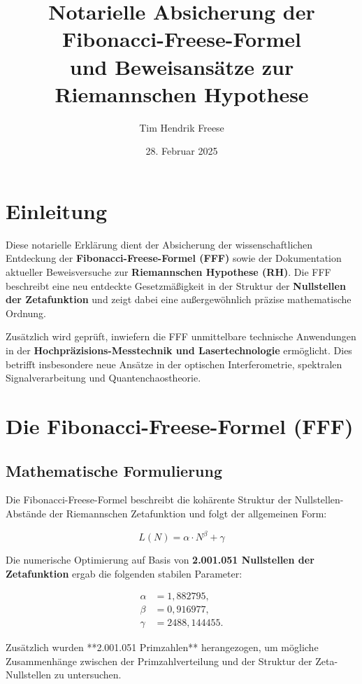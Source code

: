 \documentclass[a4paper,12pt]{article}
\title{Notarielle Absicherung der Fibonacci-Freese-Formel \\ und Beweisansätze zur Riemannschen Hypothese}
\author{Tim Hendrik Freese}
\date{28. Februar 2025}
\begin{document}
\maketitle

\section*{Einleitung}

Diese notarielle Erklärung dient der Absicherung der wissenschaftlichen Entdeckung der \textbf{Fibonacci-Freese-Formel (FFF)} sowie der Dokumentation aktueller Beweisversuche zur \textbf{Riemannschen Hypothese (RH)}. Die FFF beschreibt eine neu entdeckte Gesetzmäßigkeit in der Struktur der \textbf{Nullstellen der Zetafunktion} und zeigt dabei eine außergewöhnlich präzise mathematische Ordnung.

Zusätzlich wird geprüft, inwiefern die FFF unmittelbare technische Anwendungen in der \textbf{Hochpräzisions-Messtechnik und Lasertechnologie} ermöglicht. Dies betrifft insbesondere neue Ansätze in der optischen Interferometrie, spektralen Signalverarbeitung und Quantenchaostheorie.

\section{Die Fibonacci-Freese-Formel (FFF)}

\subsection{Mathematische Formulierung}
Die Fibonacci-Freese-Formel beschreibt die kohärente Struktur der Nullstellen-Abstände der Riemannschen Zetafunktion und folgt der allgemeinen Form:

\begin{equation}
L(N) = \alpha \cdot N^\beta + \gamma
\end{equation}

Die numerische Optimierung auf Basis von \textbf{2.001.051 Nullstellen der Zetafunktion} ergab die folgenden stabilen Parameter:

\begin{align*}
\alpha &= 1,882795, \\
\beta  &= 0,916977, \\
\gamma &= 2488,144455.
\end{align*}

Zusätzlich wurden **2.001.051 Primzahlen** herangezogen, um mögliche Zusammenhänge zwischen der Primzahlverteilung und der Struktur der Zeta-Nullstellen zu untersuchen.
\end{document}
